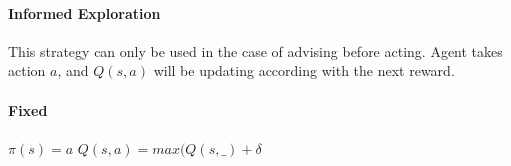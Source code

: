 \documentclass[a4paper,12pt]{article}
\begin{document}
       
       \paragraph{Informed Exploration}
       This strategy can only be used in the case of advising before acting. Agent takes action $a$,
       and $Q(s,a)$ will be updating according with the next reward.
       
       
       
       \paragraph{Fixed} 
	$\pi(s)=a$ \newline
	$Q(s,a) = max(Q(s,\_) + \delta$

%       
%             
%       
%       
\end{document}
